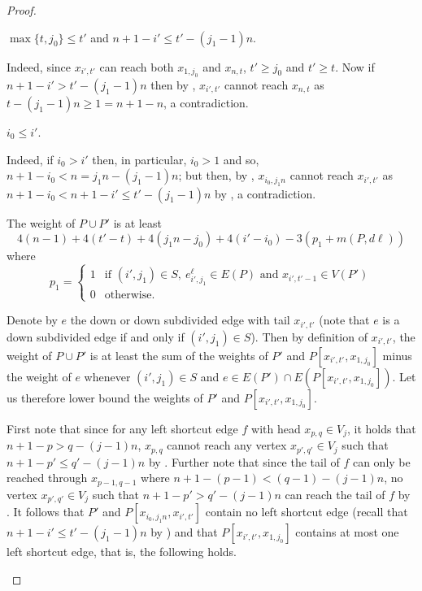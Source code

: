 \begin{proof}
\begin{observation}
\label{obs:i't'}
$\max\{t,j_0\} \leq t'$ and $n+1-i' \leq t' - (j_1-1)n$.
\end{observation}

Indeed, since $x_{i',t'}$ can reach both $x_{1,j_0}$ and $x_{n,t}$, $t' \geq j_0$ and $t' \geq t$. Now if $n+1-i' > t' - (j_1-1)n$ then by , $x_{i',t'}$ cannot reach $x_{n,t}$ as $t - (j_1-1)n \geq 1 = n+1 -n$, a contradiction. 

\begin{observation}
\label{obs:i0i'}
$i_0 \leq i'$.
\end{observation}

Indeed, if $i_0 > i'$ then, in particular, $i_0 > 1$ and so, $n+1-i_0 < n = j_1n - (j_1-1)n$; but then, by , $x_{i_0,j_1n}$ cannot reach $x_{i',t'}$ as $n+1-i_0 < n+1 - i' \leq t' - (j_1-1)n$ by , a contradiction. 

\begin{claim}
\label{clm:weightPP'}
The weight of $P \cup P'$ is at least
\[
4(n-1) + 4(t'-t) + 4(j_1n-j_0) + 4(i'-i_0) - 3(p_1 + m(P,d\ell))
\]
where 
$$
p_1 = \left\{
    \begin{array}{ll}
        1 & \mbox{if } (i',j_1) \in S, ~e^\ell_{i',j_1} \in E(P) \mbox{ and } x_{i',t'-1} \in V(P') \\
        0 & \mbox{otherwise.}
    \end{array}
\right.
$$
\end{claim}

\begin{claimproof}
Denote by $e$ the down or down subdivided edge with tail $x_{i',t'}$ (note that $e$ is a down subdivided edge if and only if $(i',j_1) \in S$). Then by definition of $x_{i',t'}$, the weight of $P \cup P'$ is at least the sum of the weights of $P'$ and $P[x_{i',t'},x_{1,j_0}]$ minus the weight of $e$ whenever $(i',j_1) \in S$ and $e \in E(P') \cap E(P[x_{i',t'},x_{1,j_0}])$. Let us therefore lower bound the weights of $P'$ and $P[x_{i',t'},x_{1,j_0}]$.

First note that since for any left shortcut edge $f$ with head $x_{p,q} \in V_j$, it holds that $n+1-p > q-(j-1)n$, $x_{p,q}$ cannot reach any vertex $x_{p',q'} \in V_j$ such that $n+1-p' \leq q' - (j-1)n$ by . Further note that since the tail of $f$ can only be reached through $x_{p-1,q-1}$ where $n+1 - (p-1) < (q-1) - (j-1)n$, no vertex $x_{p',q'} \in V_j$ such that $n+1 - p' > q' - (j-1)n$ can reach the tail of $f$ by . It follows that $P'$ and $P[x_{i_0,j_1n},x_{i',t'}]$ contain no left shortcut edge (recall that $n+1-i' \leq t' - (j_1-1)n$ by ) and that $P[x_{i',t'},x_{1,j_0}]$ contains at most one left shortcut edge, that is, the following holds.


\end{claimproof}
\end{proof}
